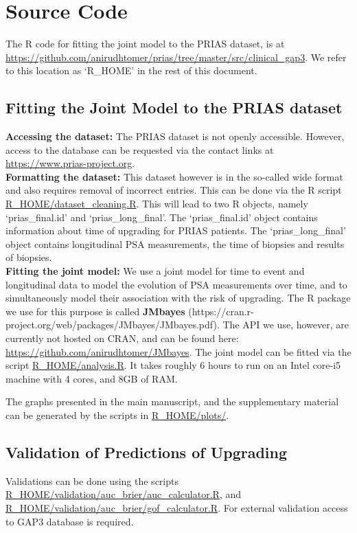 \section{Source Code}
The R code for fitting the joint model to the PRIAS dataset, is at \url{https://github.com/anirudhtomer/prias/tree/master/src/clinical_gap3}. We refer to this location as `R\_HOME' in the rest of this document.

\subsection{Fitting the Joint Model to the PRIAS dataset}
\textbf{Accessing the dataset:}
The PRIAS dataset is not openly accessible. However, access to the database can be requested via the contact links at \url{https://www.prias-project.org}.\\

\textbf{Formatting the dataset:}
This dataset however is in the so-called wide format and also requires removal of incorrect entries. This can be done via the R script \url{R_HOME/dataset_cleaning.R}. This will lead to two R objects, namely `prias\_final.id' and `prias\_long\_final'. The `prias\_final.id' object contains information about time of upgrading for PRIAS patients. The `prias\_long\_final' object contains longitudinal PSA measurements, the time of biopsies and results of biopsies.\\

\textbf{Fitting the joint model:}
We use a joint model for time to event and longitudinal data to model the evolution of PSA measurements over time, and to simultaneously model their association with the risk of upgrading. The R package we use for this purpose is called \textbf{JMbayes} (https://cran.r-project.org/web/packages/JMbayes/JMbayes.pdf). The API we use, however, are currently not hosted on CRAN, and can be found here:
\url{https://github.com/anirudhtomer/JMbayes}. The joint model can be fitted via the script \url{R_HOME/analysis.R}. It takes roughly 6 hours to run on an Intel core-i5 machine with 4 cores, and 8GB of RAM. 

The graphs presented in the main manuscript, and the supplementary material can be generated by the scripts in \url{R_HOME/plots/}.

\subsection{Validation of Predictions of Upgrading}
Validations can be done using the scripts \url{R_HOME/validation/auc_brier/auc_calculator.R}, and \url{R_HOME/validation/auc_brier/gof_calculator.R}. For external validation access to GAP3 database is required.


